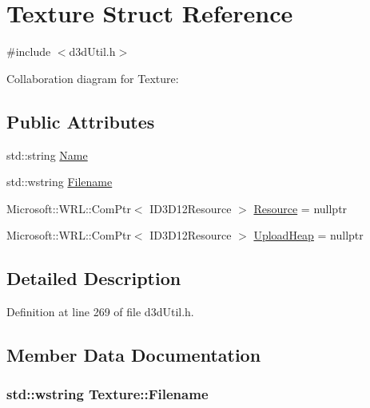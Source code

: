 \hypertarget{struct_texture}{}\section{Texture Struct Reference}
\label{struct_texture}


{\ttfamily \#include $<$d3d\+Util.\+h$>$}



Collaboration diagram for Texture\+:
\subsection*{Public Attributes}
\begin{DoxyCompactItemize}
\item 
std\+::string \hyperlink{struct_texture_aff942a6e6a80c06965b239a73ad04a2d_aff942a6e6a80c06965b239a73ad04a2d}{Name}
\item 
std\+::wstring \hyperlink{struct_texture_a4c7d999ed2653374b600a75eb8a307f7_a4c7d999ed2653374b600a75eb8a307f7}{Filename}
\item 
Microsoft\+::\+W\+R\+L\+::\+Com\+Ptr$<$ I\+D3\+D12\+Resource $>$ \hyperlink{struct_texture_ae273d56b160aa483303d13b903e00122_ae273d56b160aa483303d13b903e00122}{Resource} = nullptr
\item 
Microsoft\+::\+W\+R\+L\+::\+Com\+Ptr$<$ I\+D3\+D12\+Resource $>$ \hyperlink{struct_texture_a9e4e92ab08debca51ed2635cd3f9c5a7_a9e4e92ab08debca51ed2635cd3f9c5a7}{Upload\+Heap} = nullptr
\end{DoxyCompactItemize}


\subsection{Detailed Description}


Definition at line 269 of file d3d\+Util.\+h.



\subsection{Member Data Documentation}
\subsubsection[{\texorpdfstring{Filename}{Filename}}]{\setlength{\rightskip}{0pt plus 5cm}std\+::wstring Texture\+::\+Filename}\hypertarget{struct_texture_a4c7d999ed2653374b600a75eb8a307f7_a4c7d999ed2653374b600a75eb8a307f7}{}\label{struct_texture_a4c7d999ed2653374b600a75eb8a307f7_a4c7d999ed2653374b600a75eb8a307f7}


